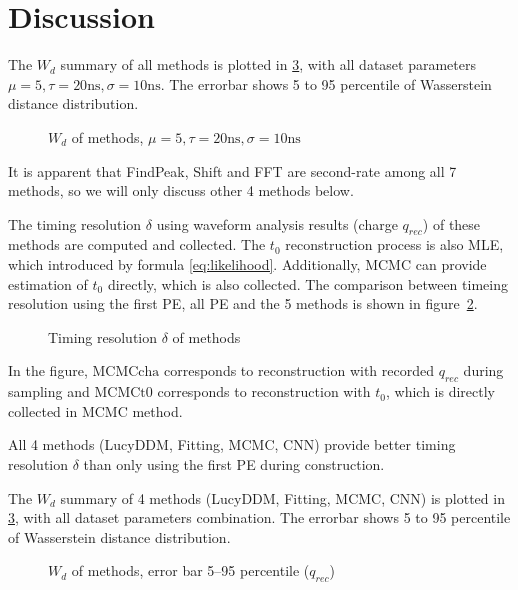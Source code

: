 \section{Discussion} %
\label{sec:discussion}

The $W_{d}$ summary of all methods is plotted in \ref{fig:chargesummary}, with all dataset parameters $\mu=5, \tau=20\mathrm{ns}, \sigma=10\mathrm{ns}$. The errorbar shows 5 to 95 percentile of Wasserstein distance distribution. 

\begin{figure}[H]
    \centering
    \scalebox{0.6}{}
    \caption{\label{fig:chargesummary} $W_{d}$ of methods, $\mu=5, \tau=20\mathrm{ns}, \sigma=10\mathrm{ns}$}
\end{figure}

It is apparent that FindPeak, Shift and FFT are second-rate among all 7 methods, so we will only discuss other 4 methods below. 

The timing resolution $\delta$ using waveform analysis results (charge $q_{rec}$) of these methods are computed and collected. The $t_{0}$ reconstruction process is also MLE, which introduced by formula \eqref{eq:likelihood}. Additionally, MCMC can provide estimation of $t_{0}$ directly, which is also collected. The comparison between timeing resolution using the first PE, all PE and the 5 methods is shown in figure~\ref{fig:deltamethods}. 

\begin{figure}[H]
    \centering
    \resizebox{\textwidth}{!}{}
    \caption{\label{fig:deltamethods} Timing resolution $\delta$ of methods}
\end{figure}

In the figure, $\mathrm{MCMCcha}$ corresponds to reconstruction with recorded $q_{rec}$ during sampling and $\mathrm{MCMCt0}$ corresponds to reconstruction with $t_{0}$, which is directly collected in MCMC method. 

All 4 methods (LucyDDM, Fitting, MCMC, CNN) provide better timing resolution $\delta$ than only using the first PE during construction. 

The $W_{d}$ summary of 4 methods (LucyDDM, Fitting, MCMC, CNN) is plotted in \ref{fig:chargesummary}, with all dataset parameters combination. The errorbar shows 5 to 95 percentile of Wasserstein distance distribution. 

\begin{figure}[H]
    \centering
    \resizebox{\textwidth}{!}{}
    \caption{\label{fig:chargesummary} $W_{d}$ of methods, error bar 5--95 percentile ($q_{rec}$)}
\end{figure}

